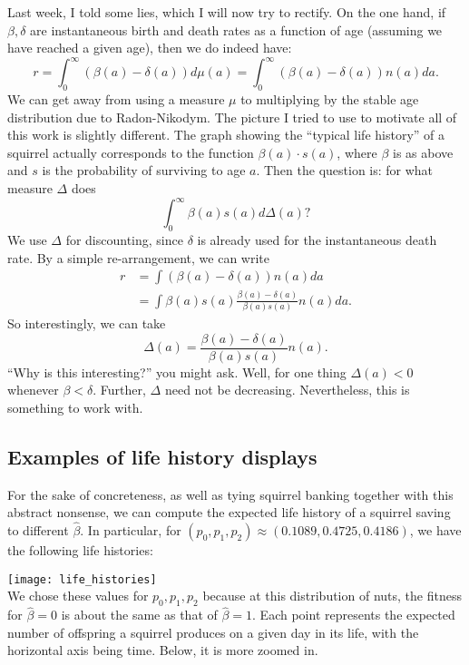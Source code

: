 Last week, I told some lies, which I will now try to rectify. On the one hand, if $\beta, \delta$ are instantaneous birth and
death rates as a function of age (assuming we have reached a given age), then we do indeed have:
$$ r = \int_0^\infty (\beta(a) - \delta(a))d\mu(a) = \int_0^\infty(\beta(a) - \delta(a))n(a) da. $$
We can get away from using a measure $\mu$ to multiplying by the stable age distribution due to Radon-Nikodym. The picture I tried
to use to motivate all of this work is slightly different. The graph showing the ``typical life history'' of a squirrel actually corresponds
to the function $\beta(a)\cdot s(a)$, where $\beta$ is as above and $s$ is the probability of surviving to age $a$. Then the question is:
for what measure $\Delta$ does 
$$ \int_0^\infty \beta(a) s(a) d \Delta(a)?$$
We use $\Delta$ for discounting, since $\delta$ is already used for the instantaneous death rate. By a simple re-arrangement, we can write
\begin{align*}
    r &= \int (\beta(a) - \delta(a))n(a) da \\
    &= \int \beta(a) s(a) \frac{\beta(a) - \delta(a)}{\beta(a) s(a)} n(a) d a.
\end{align*}
So interestingly, we can take
$$ \Delta(a) = \frac{\beta(a) - \delta(a)}{\beta(a) s(a)} n(a).  $$
``Why is this interesting?'' you might ask. Well, for one thing $\Delta(a) < 0$ whenever $\beta < \delta$. Further, $\Delta$ need not be
decreasing. Nevertheless, this is something to work with.



\subsection{Examples of life history displays}
For the sake of concreteness, as well as tying squirrel banking together with this abstract nonsense, we can compute
the expected life history of a squirrel saving to different $\hat \beta$. In particular, for $(p_0, p_1, p_2) \approx
(0.1089, 0.4725, 0.4186)$, we have the following life histories:

\texttt{[image: life\_histories]} \\

We chose these values for $p_0,p_1, p_2$ because at this distribution of nuts, the fitness for $\hat \beta = 0$ is about the same
as that of $\hat \beta = 1$. 
Each point represents the expected number of offspring a squirrel produces on a given day in its life, with the horizontal axis being
time. Below, it is more zoomed in.

